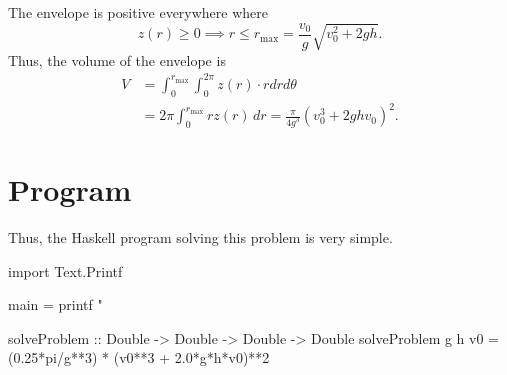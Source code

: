\documentclass{article}
\begin{document}
The envelope is positive everywhere where
\[ z(r) \geq 0 \implies r \leq r_\text{max} = \frac{v_0}{g}\sqrt{v_0^2+2gh}. \]
Thus, the volume of the envelope is
\begin{align*}
V &= \int_0^{r_\text{max}} \int_0^{2\pi} z(r) \cdot r dr d\theta \\
  &= 2\pi \int_0^{r_\text{max}} r z(r) \, dr = \frac{\pi}{4g^3} \left(v_0^3+2ghv_0\right)^2.
\end{align*}
\section*{Program}
Thus, the Haskell program solving this problem is very simple.
\begin{code}
import Text.Printf

main = printf "%

solveProblem :: Double -> Double -> Double -> Double
solveProblem g h v0 = (0.25*pi/g**3) * (v0**3 + 2.0*g*h*v0)**2
\end{code}
\end{document}
